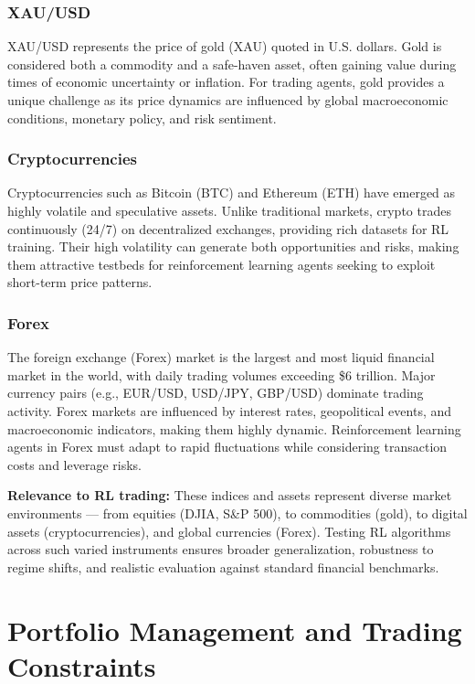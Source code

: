 \documentclass[12pt,a4paper]{report}
\begin{document}
\subsubsection{XAU/USD}

XAU/USD represents the price of gold (XAU) quoted in U.S. dollars. Gold is considered both a commodity and a safe-haven asset, often gaining value during times of economic uncertainty or inflation.  
For trading agents, gold provides a unique challenge as its price dynamics are influenced by global macroeconomic conditions, monetary policy, and risk sentiment.

\subsubsection{Cryptocurrencies}

Cryptocurrencies such as Bitcoin (BTC) and Ethereum (ETH) have emerged as highly volatile and speculative assets. Unlike traditional markets, crypto trades continuously (24/7) on decentralized exchanges, providing rich datasets for RL training.  
Their high volatility can generate both opportunities and risks, making them attractive testbeds for reinforcement learning agents seeking to exploit short-term price patterns.

\subsubsection{Forex}

The foreign exchange (Forex) market is the largest and most liquid financial market in the world, with daily trading volumes exceeding \$6 trillion. Major currency pairs (e.g., EUR/USD, USD/JPY, GBP/USD) dominate trading activity.  
Forex markets are influenced by interest rates, geopolitical events, and macroeconomic indicators, making them highly dynamic. Reinforcement learning agents in Forex must adapt to rapid fluctuations while considering transaction costs and leverage risks.

\bigskip
\textbf{Relevance to RL trading:}  
These indices and assets represent diverse market environments — from equities (DJIA, S\&P 500), to commodities (gold), to digital assets (cryptocurrencies), and global currencies (Forex). Testing RL algorithms across such varied instruments ensures broader generalization, robustness to regime shifts, and realistic evaluation against standard financial benchmarks.



\section{Portfolio Management and Trading Constraints}
\end{document}
